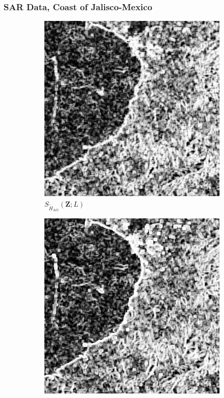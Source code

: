 \documentclass[aspectratio=1610,10pt]{beamer}
\begin{document}
\begin{frame} \frametitle{\large{SAR Data, Coast of Jalisco-Mexico }}\vspace{-0.1cm}

\begin{figure}[H]
  \centering
  \begin{subfigure}[b]{0.3\textwidth}
    \centering
    \includegraphics[width=\textwidth]{../../Figures/PNG/Entropy_Mexico_512_18L_AO_200b}
    \caption{$S_{\widetilde{H}_{\text{AO}}}(\bm{Z}; L)$}
    \label{fig:real_images_test_Mexico-1}
  \end{subfigure}
  \hfill
  \begin{subfigure}[b]{0.3\textwidth}
    \centering
    \includegraphics[width=\textwidth]{../../Figures/PNG/cv_mexico_512}

\end{subfigure}
\end{figure}
\end{frame}
\end{document}
